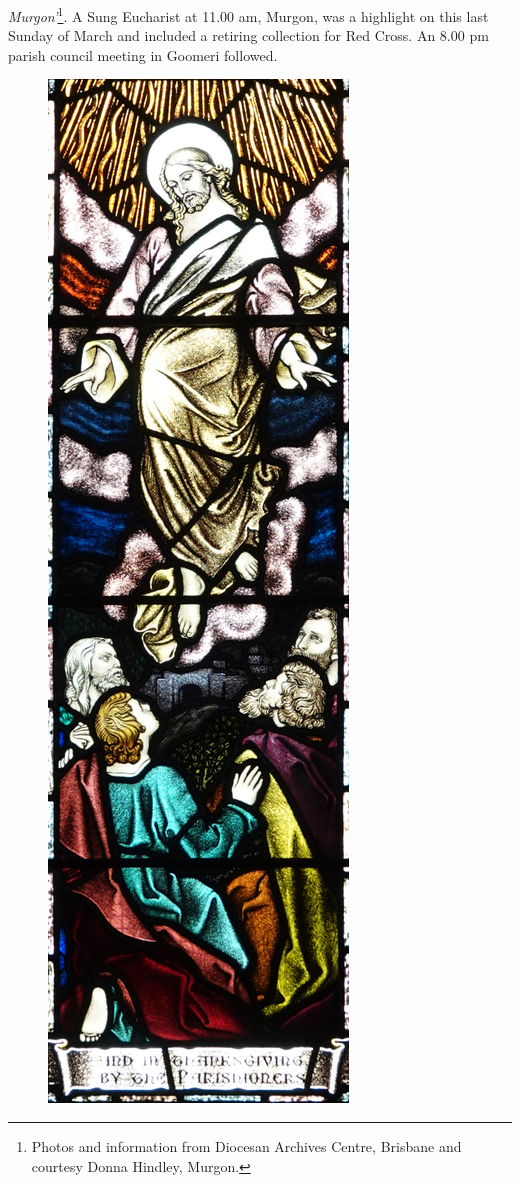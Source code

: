 \emph{Murgon'}\footnote{Photos and information from Diocesan Archives Centre, Brisbane and courtesy Donna Hindley, Murgon.}. A Sung Eucharist at 11.00 am, Murgon, was a highlight on this last Sunday of March and included a retiring collection for Red Cross. An 8.00 pm parish council meeting in Goomeri followed.








\begin{figure}
\begin{center}
\includegraphics[width=.85\linewidth,center]{../images/memorialWindow.jpg}

\end{center}
\end{figure}
